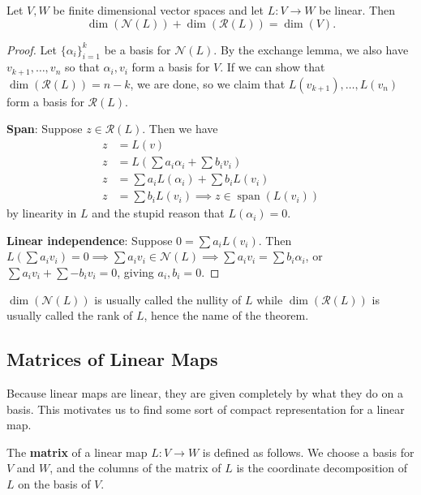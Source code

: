 \begin{thm}
Let $V, W$ be finite dimensional vector spaces and let $L : V
\rightarrow W$ be linear. Then
\[ \dim(\mathcal{N}(L)) + \dim(\mathcal{R}(L)) = \dim(V). \]
\end{thm}

\begin{proof}
Let $\lbrace \alpha_i \rbrace_{i = 1}^{k}$ be a basis for
$\mathcal{N}(L)$. By the exchange lemma, we also have $v_{k + 1}, \dots,
v_n$ so that $\alpha_i, v_i$ form a basis for $V$. If we can show that
$\dim(\mathcal{R}(L)) = n - k$, we are done, so we claim that $L(v_{k +
1}), \dots, L(v_n)$ form a basis for $\mathcal{R}(L)$.

\textbf{Span}: Suppose $z \in \mathcal{R}(L)$. Then we have
\[ \begin{aligned}
z &= L(v) \\
z &= L\left(\sum a_i \alpha_i + \sum b_i v_i\right) \\
z &= \sum a_i L(\alpha_i) + \sum b_i L(v_i) \\
z &= \sum b_i L(v_i) \implies z \in \operatorname{span}(L(v_i))
\end{aligned} \]
by linearity in $L$ and the stupid reason that $L(\alpha_i) = 0$.

\textbf{Linear independence}: Suppose $0 = \sum a_i L(v_i)$. Then
$L\left(\sum a_i v_i\right) = 0 \implies \sum a_i v_i \in \mathcal{N}(L)
\implies \sum a_i v_i = \sum b_i \alpha_i$, or $\sum a_i v_i + \sum -b_i
v_i = 0$, giving $a_i, b_i = 0$.
\end{proof}

\begin{rem}
$\dim(\mathcal{N}(L))$ is usually called the nullity of $L$ while
$\dim(\mathcal{R}(L))$ is usually called the rank of $L$, hence the name
of the theorem.
\end{rem}

\subsection{Matrices of Linear Maps}
Because linear maps are linear, they are given completely by what they
do on a basis. This motivates us to find some sort of compact
representation for a linear map.

\begin{df}
The \textbf{matrix} of a linear map $L : V \rightarrow W$ is defined as
follows. We choose a basis for $V$ and $W$, and the columns of the
matrix of $L$ is the coordinate decomposition of $L$ on the basis of
$V$.
\end{df}

